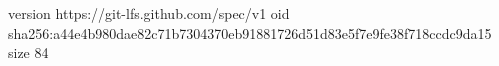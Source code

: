 version https://git-lfs.github.com/spec/v1
oid sha256:a44e4b980dae82c71b7304370eb91881726d51d83e5f7e9fe38f718ccdc9da15
size 84
